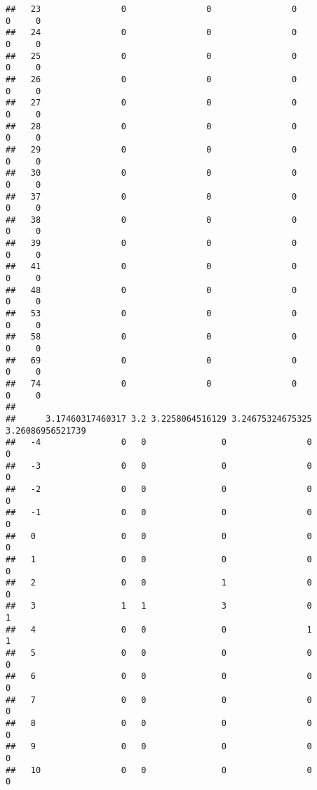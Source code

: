 \documentclass[]{article}
\begin{document}
\begin{verbatim}
##   23                0                0                0                0     0
##   24                0                0                0                0     0
##   25                0                0                0                0     0
##   26                0                0                0                0     0
##   27                0                0                0                0     0
##   28                0                0                0                0     0
##   29                0                0                0                0     0
##   30                0                0                0                0     0
##   37                0                0                0                0     0
##   38                0                0                0                0     0
##   39                0                0                0                0     0
##   41                0                0                0                0     0
##   48                0                0                0                0     0
##   53                0                0                0                0     0
##   58                0                0                0                0     0
##   69                0                0                0                0     0
##   74                0                0                0                0     0
##     
##      3.17460317460317 3.2 3.2258064516129 3.24675324675325 3.26086956521739
##   -4                0   0               0                0                0
##   -3                0   0               0                0                0
##   -2                0   0               0                0                0
##   -1                0   0               0                0                0
##   0                 0   0               0                0                0
##   1                 0   0               0                0                0
##   2                 0   0               1                0                0
##   3                 1   1               3                0                1
##   4                 0   0               0                1                1
##   5                 0   0               0                0                0
##   6                 0   0               0                0                0
##   7                 0   0               0                0                0
##   8                 0   0               0                0                0
##   9                 0   0               0                0                0
##   10                0   0               0                0                0

\end{verbatim}
\end{document}
